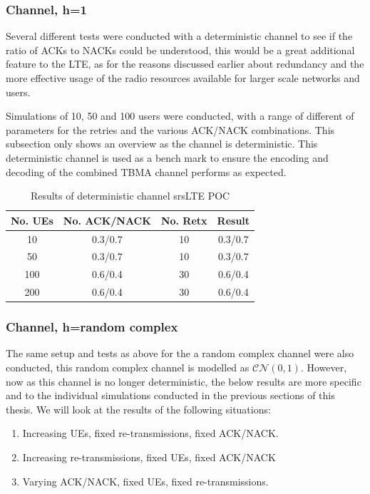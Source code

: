 \documentclass{article}
\begin{document}
\subsubsection{Channel, h=1}
Several different tests were conducted with a deterministic channel to see if the ratio of ACKs to NACKs could be understood, this would be a great additional feature to the LTE, as for the reasons discussed earlier about redundancy and the more effective usage of the radio resources available for larger scale networks and users. 

Simulations of 10, 50 and 100 users were conducted, with a range of different of parameters for the retries and the various ACK/NACK combinations. This subsection only shows an overview as the channel is deterministic. This deterministic channel is used as a bench mark to ensure the encoding and decoding of the combined TBMA channel performs as expected. 

\begin{table}[H]
    \centering
 \begin{tabular}{||c c c c||} 
 \hline
 No. UEs & No. ACK/NACK & No. Retx & Result \\ [0.5ex] 
 \hline\hline
 10 & 0.3/0.7 & 10 &  0.3/0.7 \\ 
 \hline
 50 & 0.3/0.7 & 10 & 0.3/0.7 \\
 \hline
 100 & 0.6/0.4 & 30 & 0.6/0.4 \\
 \hline
 200 & 0.6/0.4 & 30 & 0.6/0.4 \\ [1ex] 
 \hline
\end{tabular}
    \caption{Results of deterministic channel srsLTE POC}
    \label{tab:my_label}
\end{table}

\subsubsection{Channel, h=random complex}
The same setup and tests as above for the a random complex channel were also conducted, this random complex channel is modelled as $\mathcal{CN}(0,1)$. However, now as this channel is no longer deterministic, the below results are more specific and to the individual simulations conducted in the previous sections of this thesis. We will look at the results of the following situations:

\begin{enumerate}
    \item Increasing UEs, fixed re-transmissions, fixed ACK/NACK. 
    \item Increasing re-transmissions, fixed UEs, fixed ACK/NACK
    \item Varying ACK/NACK, fixed UEs, fixed re-transmissions.
\end{enumerate}
\end{document}
